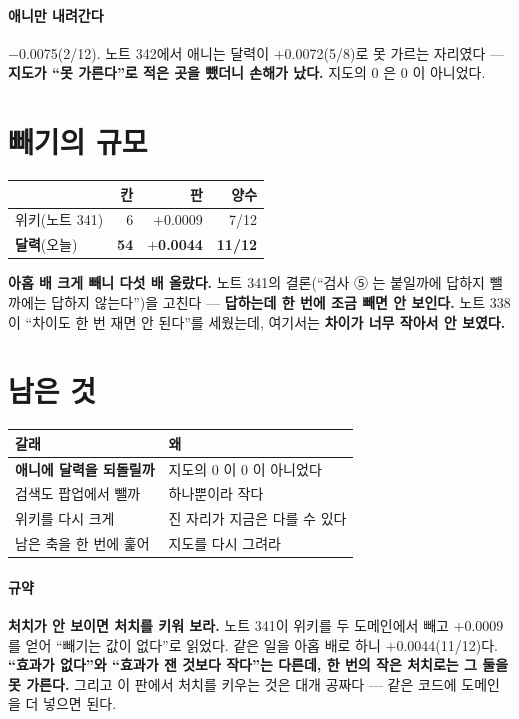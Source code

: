 \documentclass[10pt]{article}
\begin{document}
\paragraph{애니만 내려간다} $-$0.0075(2/12). 노트 342에서 애니는 달력이
$+$0.0072(5/8)로 못 가르는 자리였다 --- \textbf{지도가 ``못 가른다''로
적은 곳을 뺐더니 손해가 났다.} 지도의 0 은 0 이 아니었다.

\section{빼기의 규모}

\begin{center}\small
\begin{tabular}{lrrr}
\hline
 & 칸 & 판 & 양수 \\
\hline
위키(노트 341) & 6 & $+$0.0009 & 7/12 \\
\textbf{달력}(오늘) & \textbf{54} & \textbf{$+$0.0044} & \textbf{11/12} \\
\hline
\end{tabular}
\end{center}

\textbf{아홉 배 크게 빼니 다섯 배 올랐다.} 노트 341의 결론(``검사 ⑤ 는
붙일까에 답하지 뺄까에는 답하지 않는다'')을 고친다 --- \textbf{답하는데
한 번에 조금 빼면 안 보인다.} 노트 338이 ``차이도 한 번 재면 안 된다''를
세웠는데, 여기서는 \textbf{차이가 너무 작아서 안 보였다.}

\section{남은 것}
\begin{center}\footnotesize
\begin{tabular}{ll}
\hline
갈래 & 왜 \\
\hline
\textbf{애니에 달력을 되돌릴까} & 지도의 0 이 0 이 아니었다 \\
검색도 팝업에서 뺄까 & 하나뿐이라 작다 \\
위키를 다시 크게 & 진 자리가 지금은 다를 수 있다 \\
남은 축을 한 번에 훑어 & 지도를 다시 그려라 \\
\hline
\end{tabular}
\end{center}

\paragraph{규약} \textbf{처치가 안 보이면 처치를 키워 보라.} 노트 341이
위키를 두 도메인에서 빼고 $+$0.0009 를 얻어 ``빼기는 값이 없다''로 읽었다.
같은 일을 아홉 배로 하니 $+$0.0044(11/12)다. \textbf{``효과가 없다''와
``효과가 잰 것보다 작다''는 다른데, 한 번의 작은 처치로는 그 둘을 못
가른다.} 그리고 이 판에서 처치를 키우는 것은 대개 공짜다 --- 같은 코드에
도메인을 더 넣으면 된다.
\end{document}
